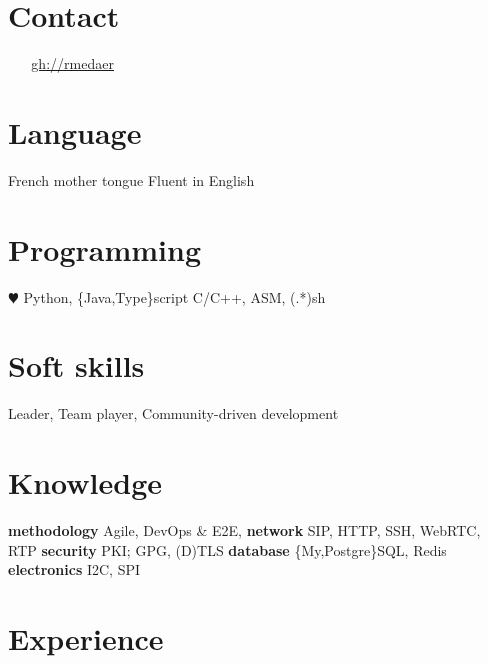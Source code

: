 \documentclass[]{friggeri-cv} %
\begin{document}


\begin{aside} %
\section{Contact}
\myAddress
~
\href{\myUriPhoneNumber}{\myPhoneNumber}
~
\href{mailto:\myPrivateMail}{\ul{\myPrivateMail}}
\href{http://github.com/rmedaer}{\ul{gh://rmedaer}}
\section{Language}
French mother tongue
Fluent in English
\section{Programming}
{\color{red} $\varheartsuit$} Python, \{Java,Type\}script
C/C++, ASM, (.*)sh
\section{Soft skills}
Leader,
Team player,
Community-driven development
\section{Knowledge}
\textbf{methodology}
Agile, DevOps \& E2E,
\textbf{network}
SIP, HTTP, SSH,
WebRTC, RTP
\textbf{security}
PKI; GPG, (D)TLS
\textbf{database}
\{My,Postgre\}SQL, Redis
\textbf{electronics}
I2C, SPI
\end{aside}


\section{Experience}
\end{document}
